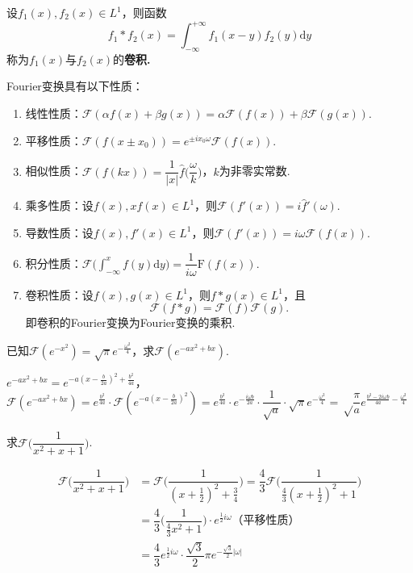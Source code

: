 \documentclass[openany,oneside]{ctexbook}
\begin{document}
\begin{definition}[卷积]
    设$f_1(x),f_2(x)\in L^1$，则函数
    \[f_1*f_2(x)=\int_{-\infty}^{+\infty}f_1(x-y)f_2(y)\mathrm{d}y\]
    称为$f_1(x)$与$f_2(x)$的\bf{卷积}.
\end{definition}

Fourier变换具有以下性质：
\begin{enumerate}[label=(\arabic*), itemsep=1pt]
    \item 线性性质：$\mathcal{F}(\alpha f(x)+\beta g(x))=\alpha\mathcal{F}(f(x))+\beta\mathcal{F}(g(x))$.
    \item 平移性质：$\mathcal{F}(f(x\pm x_0))=e^{\pm ix_0\omega}\mathcal{F}(f(x))$.
    \item 相似性质：$\mathcal{F}(f(kx))=\dfrac{1}{|x|}\hat{f}\biggl(\dfrac{\omega}{k}\biggr)$，$k$为非零实常数.
    \item 乘多性质：设$f(x),xf(x)\in L^1$，则$\mathcal{F}(f'(x))=i\hat{f}'(\omega).$
    \item 导数性质：设$f(x),f'(x)\in L^1$，则$\mathcal{F}(f'(x))=i\omega\mathcal{F}(f(x)).$
    \item 积分性质：$\mathcal{F}\biggl(\displaystyle\int_{-\infty}^{x}f(y)\mathrm{d}y\biggr)=\dfrac{1}{i\omega}\mathrm{F}(f(x)).$
    \item 卷积性质：设$f(x),g(x)\in L^1$，则$f*g(x)\in L^1$，且
                    \[\mathcal{F}(f*g)=\mathcal{F}(f)\mathcal{F}(g).\]
                    即卷积的Fourier变换为Fourier变换的乘积.
\end{enumerate}

\begin{example}
    已知$\mathcal{F}(e^{-x^2})=\sqrt\pi e^{-\frac{\omega^2}{4}}$，求$\mathcal{F}(e^{-ax^2+bx})$.
\end{example}
\begin{solution}
    $e^{-ax^2+bx}=e^{-a(x-\frac{b}{2a})^2+\frac{b^2}{4a}}$，\\
    $\mathcal{F}(e^{-ax^2+bx})=e^\frac{b^2}{4a}\cdot\mathcal{F}(e^{-a(x-\frac{b}{2a})^2})=e^\frac{b^2}{4a}\cdot e^{-\frac{i\omega b}{2a}}\cdot \dfrac{1}{\sqrt a}\cdot\sqrt\pi e^{-\frac{\omega^2}{4}}=\sqrt\dfrac{\pi}{a}e^{\frac{b^2-2i\omega b}{4a}-\frac{\omega^2}{4}}$
\end{solution}

\begin{example}
    求$\mathcal{F}\biggl(\dfrac{1}{x^2+x+1}\biggr)$.
\end{example}
\begin{solution}
    \begin{align*}
        \mathcal{F}\biggl(\dfrac{1}{x^2+x+1}\biggr)&=\mathcal{F}\biggl(\dfrac{1}{(x+\frac{1}{2})^2+\frac{3}{4}}\biggr)=\dfrac{4}{3}\mathcal{F}\biggl(\dfrac{1}{\frac{4}{3}(x+\frac{1}{2})^2+1}\biggr)\\
        &=\dfrac{4}{3}\biggl(\dfrac{1}{\frac{4}{3}x^2+1}\biggr)\cdot e^{\frac{1}{2}i\omega}\text{（平移性质）}\\
        &=\dfrac{4}{3}e^{\frac{1}{2}i\omega}\cdot\dfrac{\sqrt3}{2}\pi e^{-\frac{\sqrt3}{2}|\omega|}
    \end{align*}
\end{solution}
\end{document}
